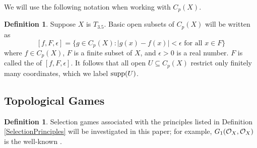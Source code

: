 \documentclass{amsart}
\theoremstyle{plain}
\theoremstyle{definition}
\newtheorem{definition}[theorem]{Definition}
\theoremstyle{remark}
\theoremstyle{plain}
\theoremstyle{definition}
\theoremstyle{remark}
\begin{document}
We will use the following notation when working with \(C_p(X)\).

\begin{definition}
 Suppose \(X\) is \(T_{3.5}\).
 Basic open subsets of \(C_p(X)\) will be written as
 \[
  [f,F,\epsilon] = \{g\in C_p(X):|g(x)-f(x)|<\epsilon\text{ for all }x\in F\}
 \]
 where \(f \in C_p(X)\), \(F\) is a finite subset of \(X\), and \(\epsilon > 0\) is a real number.
 \(F\) is called the  of \([f,F,\epsilon]\).
 It follows that all open \(U \subseteq C_p(X)\) restrict only finitely many
 coordinates, which we label \(\textrm{supp}(U)\).
\end{definition}

\subsection{Topological Games}

\begin{definition}
 Selection games associated with the principles listed in Definition \ref{SelectionPrinciples} 
 will be investigated in this paper; for example, \(G_{1}(\mathcal{O}_X,\mathcal{O}_X)\) is the well-known 
 .
\end{definition}
  
\end{document}
